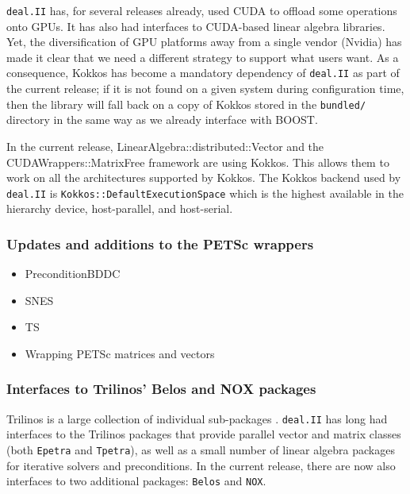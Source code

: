 \documentclass{ansarticle-preprint}
\newcommand{\specialword}[1]{\texttt{#1}}
\newcommand{\dealii}{{\specialword{deal.II}}\xspace}
\begin{document}
\dealii{} has, for several releases already, used CUDA to offload some
operations onto GPUs. It has also had interfaces to CUDA-based linear
algebra libraries. Yet, the diversification of GPU platforms away from
a single vendor (Nvidia) has made it clear that we need a different
strategy to support what users want. As a consequence, Kokkos has
become a mandatory dependency of \dealii{} as part of the current
release; if it is not found on a given system during configuration
time, then the library will fall back on a copy of Kokkos stored in
the \texttt{bundled/} directory in the same way as we already
interface with BOOST.

In the current release, LinearAlgebra::distributed::Vector and the
CUDAWrappers::MatrixFree framework are using Kokkos. This allows them to work on
all the architectures supported by Kokkos. The Kokkos backend used by \dealii is
\texttt{Kokkos::DefaultExecutionSpace} which is the highest available in the hierarchy
device, host-parallel, and host-serial.



\subsubsection{Updates and additions to the PETSc wrappers}\label{sec:petsc}


\begin{itemize}
\item PreconditionBDDC
\item SNES
\item TS
\item Wrapping PETSc matrices and vectors
\end{itemize}

\subsubsection{Interfaces to Trilinos' Belos and NOX packages}\label{sec:trilinos}

Trilinos is a large collection of individual sub-packages \cite{heroux2005trilinos,trilinos-web-page}. \dealii{}
has long had interfaces to the Trilinos packages that provide parallel
vector and matrix classes (both \texttt{Epetra} and \texttt{Tpetra}),
as well as a small number of linear algebra packages for iterative
solvers and preconditions. In the current release, there are now also
interfaces to two additional packages: \texttt{Belos} and \texttt{NOX}.
\end{document}
